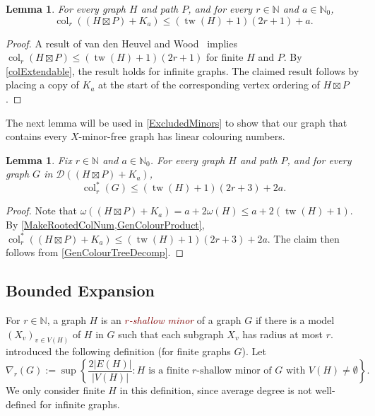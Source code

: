 \documentclass[a4paper,11pt]{article}
\makeatletter
\newcommand{\hdefn}[2]{\textcolor{Maroon}{\emph{#1-#2}}\index{#2@#1-#2}}
\theoremstyle{plain}
\newtheorem{lem}[thm]{Lemma}
\theoremstyle{definition}
\renewcommand{\leq}{\leqslant}
\DeclareMathOperator{\tw}{tw}
\DeclareMathOperator{\col}{col}
\newcommand{\DD}{\mathcal{D}}
\newcommand{\NN}{\mathbb{N}}
\makeatother
\begin{document}
\begin{lem}
\label{GenColourProduct}
For every graph $H$ and path $P$, and for every $r\in\NN$ and $a\in\NN_0$, 
\begin{equation*}
\col_r(( H\boxtimes P) + K_a) \leq (\tw(H)+1)(2r+1) + a.
\end{equation*}
\end{lem}

\begin{proof}
A result of van den Heuvel and Wood~\citep[Lemma~30, arXiv~version]{vdHW18} implies $\col_r(H\boxtimes P) \leq (\tw(H)+1)(2r+1)$ for finite $H$ and $P$. 
By \cref{colExtendable}, the result holds for infinite graphs. The claimed result follows by placing a copy of $K_a$ at the start of the corresponding vertex ordering of $H\boxtimes P$. 
\end{proof}

The next lemma will be used in \cref{ExcludedMinors} to show that our graph that contains every $X$-minor-free graph has linear colouring numbers. 

\begin{lem}
\label{GenColourProductTreeDecomp}
Fix $r\in\NN$ and $a\in\NN_0$. For every graph $H$ and path $P$, and for every graph $G$ in $\DD( (H\boxtimes P)+K_a )$, 
$$\col^*_r(G) \leq  (\tw(H)+1)(2r+3)+2a.$$
\end{lem}

\begin{proof}
Note that $\omega((H\boxtimes P)+K_a) = a + 2\omega(H) \leq a + 2(\tw(H)+1)$. By \cref{MakeRootedColNum,GenColourProduct}, $\col^*_r( (H\boxtimes P)+K_a) \leq (\tw(H)+1)(2r+3)+2a$. The claim then follows from \cref{GenColourTreeDecomp}.
\end{proof}

\subsection{Bounded Expansion}
\label{Expansion}

For $r\in \mathbb{N}$, a graph $H$ is an \hdefn{$r$}{shallow minor} of a graph $G$ if there is a model $(X_v)_{v\in V(H)}$ of $H$ in $G$ such that each subgraph $X_v$ has radius at most $r$. \citet{Sparsity} introduced the following definition (for finite graphs $G$). Let 
$$\nabla_r(G):=\sup \left\{\frac{2|E(H)|}{|V(H)|} : \text{$H$ is a finite $r$-shallow minor of $G$ with $V(H)\neq\emptyset$}\right\}.$$
We only consider finite $H$ in this definition, since average degree is not well-defined for infinite graphs.
\end{document}
